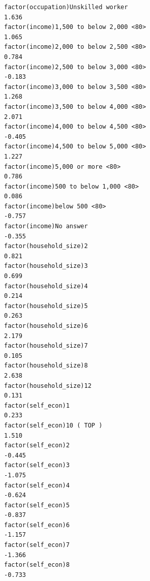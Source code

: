 \documentclass[
]{article}
\begin{document}
\begin{table}
\begin{minipage}[t]{\linewidth}
{\begin{verbatim}
factor(occupation)Unskilled worker                                                  1.636
factor(income)1,500 to below 2,000 <80>                                             1.065
factor(income)2,000 to below 2,500 <80>                                             0.784
factor(income)2,500 to below 3,000 <80>                                            -0.183
factor(income)3,000 to below 3,500 <80>                                             1.268
factor(income)3,500 to below 4,000 <80>                                             2.071
factor(income)4,000 to below 4,500 <80>                                            -0.405
factor(income)4,500 to below 5,000 <80>                                             1.227
factor(income)5,000 or more <80>                                                    0.786
factor(income)500 to below 1,000 <80>                                               0.086
factor(income)below 500 <80>                                                       -0.757
factor(income)No answer                                                            -0.355
factor(household_size)2                                                             0.821
factor(household_size)3                                                             0.699
factor(household_size)4                                                             0.214
factor(household_size)5                                                             0.263
factor(household_size)6                                                             2.179
factor(household_size)7                                                             0.105
factor(household_size)8                                                             2.638
factor(household_size)12                                                            0.131
factor(self_econ)1                                                                  0.233
factor(self_econ)10 ( TOP )                                                         1.510
factor(self_econ)2                                                                 -0.445
factor(self_econ)3                                                                 -1.075
factor(self_econ)4                                                                 -0.624
factor(self_econ)5                                                                 -0.837
factor(self_econ)6                                                                 -1.157
factor(self_econ)7                                                                 -1.366
factor(self_econ)8                                                                 -0.733

\end{verbatim}}
\end{minipage}
\end{table}
\end{document}
